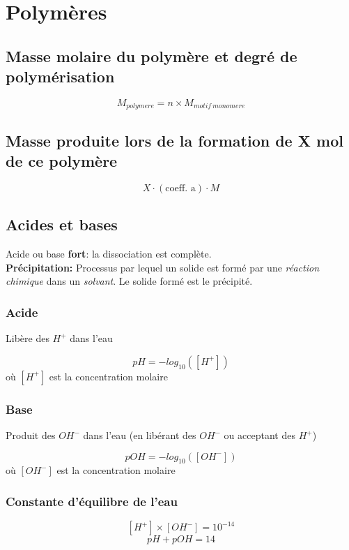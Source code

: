 \documentclass[twocolumn,letterpaper,8pt]{extarticle}
\begin{document}
\section{Polymères}
\subsection{Masse molaire du polymère et degré de polymérisation}
$$M_{polymere}=n \times M_{motif\ monomere}$$
\subsection{Masse produite lors de la formation de X mol de ce polymère}
$$X \cdot (\textrm{coeff. a}) \cdot M$$


\subsection{Acides et bases}
Acide ou base \textbf{fort}: la dissociation est complète.\\
\textbf{Précipitation:} Processus par lequel un solide est formé par une \textit{réaction chimique} dans un \textit{solvant}. Le solide formé est le précipité.

\subsubsection{Acide}
Libère des $H^+$ dans l'eau
\begin{center}
    $$pH=-log_{10}([H^+])$$
    {\footnotesize où $[H^+]$ est la concentration molaire}
\end{center}

\subsubsection{Base}
Produit des $OH^-$ dans l'eau {\small (en libérant des $OH^-$ ou acceptant des $H^+$)}
\begin{center}
    $$pOH=-log_{10}([OH^-])$$
    {\footnotesize où $[OH^-]$ est la concentration molaire}
\end{center}

\subsubsection{Constante d'équilibre de l'eau}
$$[H^+] \times [OH^-] = 10^{-14}$$
$$pH + pOH = 14$$
\end{document}
